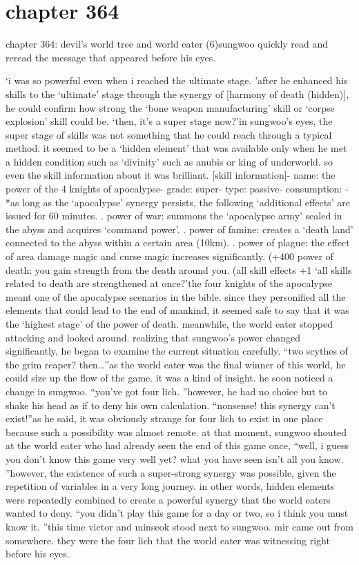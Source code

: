 \section{chapter 364}

chapter 364: devil’s world tree and world eater (6)sungwoo quickly read and reread the message that appeared before his eyes.





‘i was so powerful even when i reached the ultimate stage.
’after he enhanced his skills to the ‘ultimate’ stage through the synergy of [harmony of death (hidden)], he could confirm how strong the ‘bone weapon manufacturing’ skill or ‘corpse explosion’ skill could be.
‘then, it’s a super stage now?’in sungwoo’s eyes, the super stage of skills was not something that he could reach through a typical method.
 it seemed to be a ‘hidden element’ that was available only when he met a hidden condition such as ‘divinity’ such as anubis or king of underworld.
so even the skill information about it was brilliant.
[skill information]- name: the power of the 4 knights of apocalypse- grade: super- type: passive- consumption: -*as long as the ‘apocalypse’ synergy persists, the following ‘additional effects’ are issued for 60 minutes.
.
 power of war: summons the ‘apocalypse army’ sealed in the abyss and acquires ‘command power’.
.
 power of famine: creates a ‘death land’ connected to the abyss within a certain area (10km).
.
 power of plague: the effect of area damage magic and curse magic increases significantly.
 (+400%
 power of death: you gain strength from the death around you.
 (all skill effects +1%
‘all skills related to death are strengthened at once?’the four knights of the apocalypse meant one of the apocalypse scenarios in the bible.
since they personified all the elements that could lead to the end of mankind, it seemed safe to say that it was the ‘highest stage’ of the power of death.
meanwhile, the world eater stopped attacking and looked around.
 realizing that sungwoo’s power changed significantly, he began to examine the current situation carefully.
“two scythes of the grim reaper? then…”as the world eater was the final winner of this world, he could size up the flow of the game.
 it was a kind of insight.
 he soon noticed a change in sungwoo.
“you’ve got four lich.
”however, he had no choice but to shake his head as if to deny his own calculation.
“nonsense! this synergy can’t exist!”as he said, it was obviously strange for four lich to exist in one place because such a possibility was almost remote.
at that moment, sungwoo shouted at the world eater who had already seen the end of this game once, “well, i guess you don’t know this game very well yet? what you have seen isn’t all you know.
”however, the existence of such a super-strong synergy was possible, given the repetition of variables in a very long journey.
 in other words, hidden elements were repeatedly combined to create a powerful synergy that the world eaters wanted to deny.
“you didn’t play this game for a day or two, so i think you must know it.
”this time victor and minseok stood next to sungwoo.
 mir came out from somewhere.
they were the four lich that the world eater was witnessing right before his eyes.

